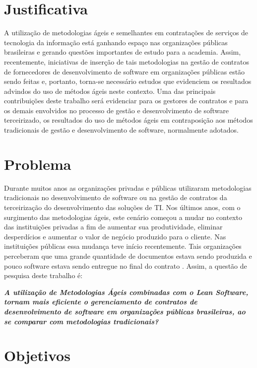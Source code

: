 \section[Justificativa]{Justificativa}

A utilização de metodologias ágeis e semelhantes em contratações de serviços de tecnologia da informação está ganhando espaço nas organizações públicas brasileiras e gerando questões importantes de estudo para a academia. Assim, recentemente, iniciativas de inserção de tais metodologias na gestão de contratos de fornecedores de desenvolvimento de software em organizações públicas estão sendo feitas e, portanto, torna-se necessário estudos que evidenciem os resultados advindos do uso de métodos ágeis neste contexto. Uma das principais contribuições deste trabalho será evidenciar para os gestores de contratos e para os demais envolvidos no processo de gestão e desenvolvimento de software terceirizado, os resultados do uso de métodos ágeis em contraposição aos métodos tradicionais de gestão e desenvolvimento de software, normalmente adotados. 

\section[Problema]{Problema}

Durante muitos anos as organizações privadas e públicas utilizaram metodologias tradicionais no desenvolvimento de software ou na gestão de contratos da terceirização do desenvolvimento das soluções de TI. Nos últimos anos, com o surgimento das metodologias ágeis, este cenário começou a mudar no contexto das instituições privadas a fim de aumentar sua produtividade, eliminar desperdícios e aumentar o valor de negócio produzido para o cliente. Nas instituições públicas essa mudança teve início recentemente. Tais organizações perceberam que uma grande quantidade de documentos estava sendo produzida e pouco software estava sendo entregue no final do contrato \cite{TCU:2013}. Assim, a questão de pesquisa deste trabalho é:

\textit{\textbf {A utilização de Metodologias Ágeis combinadas com o Lean Software, tornam mais eficiente o gerenciamento de contratos de desenvolvimento de software em organizações públicas brasileiras, ao se comparar com metodologias tradicionais?}}

\section[Objetivos]{Objetivos}

